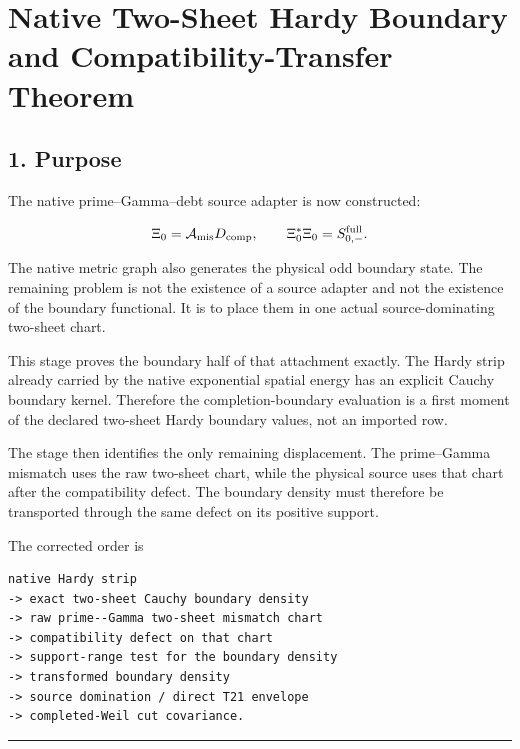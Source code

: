 \hypertarget{native-two-sheet-hardy-boundary-and-compatibility-transfer-theorem}{%
\chapter{Native Two-Sheet Hardy Boundary and Compatibility-Transfer Theorem}\label{native-two-sheet-hardy-boundary-and-compatibility-transfer-theorem}}

\hypertarget{purpose}{%
\section{1. Purpose}\label{purpose}}

The native prime--Gamma--debt source adapter is now constructed:

\[
\Xi_0=\mathcal A_{\rm mis}D_{\rm comp},
\qquad
\Xi_0^*\Xi_0=S_{0,-}^{\rm full}.
\]

The native metric graph also generates the physical odd boundary state. The
remaining problem is not the existence of a source adapter and not the
existence of the boundary functional. It is to place them in one actual
source-dominating two-sheet chart.

This stage proves the boundary half of that attachment exactly. The Hardy strip
already carried by the native exponential spatial energy has an explicit
Cauchy boundary kernel. Therefore the completion-boundary evaluation is a
first moment of the declared two-sheet Hardy boundary values, not an imported
row.

The stage then identifies the only remaining displacement. The prime--Gamma
mismatch uses the raw two-sheet chart, while the physical source uses that chart
after the compatibility defect. The boundary density must therefore be
transported through the same defect on its positive support.

The corrected order is

\begin{verbatim}
native Hardy strip
-> exact two-sheet Cauchy boundary density
-> raw prime--Gamma two-sheet mismatch chart
-> compatibility defect on that chart
-> support-range test for the boundary density
-> transformed boundary density
-> source domination / direct T21 envelope
-> completed-Weil cut covariance.
\end{verbatim}

\begin{center}\rule{0.5\linewidth}{0.5pt}\end{center}

